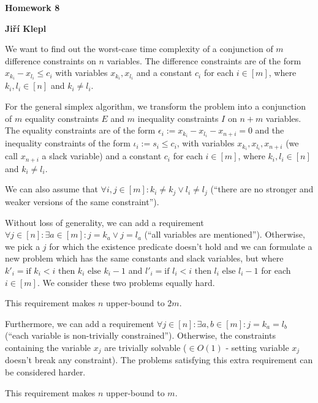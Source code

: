 \documentclass[a4paper,12pt]{article} %
\begin{document}
\begin{center}
    {\Large \bf Homework 8}
    \vspace{2mm}

    {\bf Jiří Klepl}

\end{center}

\vspace{0.4cm}

We want to find out the worst-case time complexity of a conjunction of $m$ difference constraints on $n$ variables. The difference constraints are of the form $x_{k_i} - x_{l_i} \leq c_i$ with variables $x_{k_i}, x_{l_i}$ and a constant $c_i$ for each $i \in [m]$, where $k_i, l_i \in [n]$ and $k_i \neq l_i$.

For the general simplex algorithm, we transform the problem into a conjunction of $m$ equality constraints $E$ and $m$ inequality constraints $I$ on $n+m$ variables. The equality constraints are of the form $\epsilon_i := x_{k_i} - x_{l_i} - x_{n + i} = 0$ and the inequality constraints of the form $\iota_i := s_i \leq c_i$, with variables $x_{k_i}, x_{l_i}, x_{n  + i}$ (we call $x_{n + i}$ a slack variable) and a constant $c_i$ for each $i \in [m]$, where $k_i, l_i \in [n]$ and $k_i \neq l_i$.

We can also assume that $\forall i, j \in [m] : k_i \neq k_j \vee l_i \neq l_j$ (``there are no stronger and weaker versions of the same constraint'').

Without loss of generality, we can add a requirement $\forall j \in [n] : \exists a \in [m] : j = k_a \lor j = l_a$ (``all variables are mentioned''). Otherwise, we pick a $j$ for which the existence predicate doesn't hold and we can formulate a new problem which has the same constants and slack variables, but where $k'_i = \text{if } k_i < i \text { then } k_i \text{ else } k_i - 1$ and $l'_i = \text{if } l_i < i \text { then } l_i \text{ else } l_i - 1$ for each $i \in [m]$. We consider these two problems equally hard.

This requirement makes $n$ upper-bound to $2m$.

Furthermore, we can add a requirement $\forall j \in [n] : \exists a, b \in [m] : j = k_a = l_b$ (``each variable is non-trivially constrained''). Otherwise, the constraints containing the variable $x_j$ are trivially solvable ($\in O(1)$ - setting variable $x_j$ doesn't break any constraint). The problems satisfying this extra requirement can be considered harder.

This requirement makes $n$ upper-bound to $m$.
\end{document}
